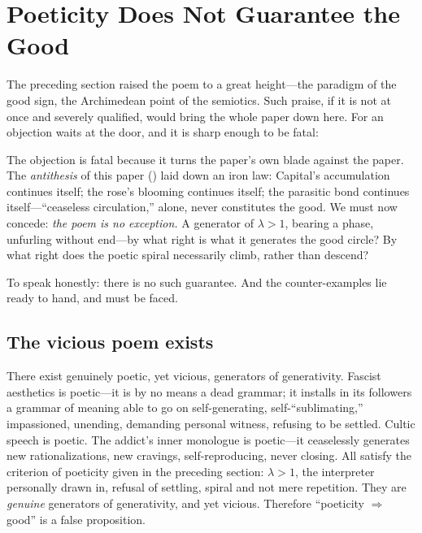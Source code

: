 \section{Poeticity Does Not Guarantee the Good}
\label{p09:sec:turn}

The preceding section raised the poem to a great height---the paradigm of the good sign, the Archimedean point of the semiotics. Such praise, if it is not at once and severely qualified, would bring the whole paper down here. For an objection waits at the door, and it is sharp enough to be fatal: 

The objection is fatal because it turns the paper's own blade against the paper. The \emph{antithesis} of this paper () laid down an iron law:  Capital's accumulation continues itself; the rose's blooming continues itself; the parasitic bond continues itself---``ceaseless circulation,'' alone, never constitutes the good. We must now concede: \emph{the poem is no exception.} A generator of $\lambda>1$, bearing a phase, unfurling without end---by what right is what it generates the good circle? By what right does the poetic spiral necessarily climb, rather than descend?

To speak honestly: there is no such guarantee. And the counter-examples lie ready to hand, and must be faced.

\subsection{The vicious poem exists}
\label{p09:sec:vicious-poem}

\begin{claim}
There exist genuinely poetic, yet vicious, generators of generativity. Fascist aesthetics is poetic---it is by no means a dead grammar; it installs in its followers a grammar of meaning able to go on self-generating, self-``sublimating,'' impassioned, unending, demanding personal witness, refusing to be settled. Cultic speech is poetic. The addict's inner monologue is poetic---it ceaselessly generates new rationalizations, new cravings, self-reproducing, never closing. All satisfy the criterion of poeticity given in the preceding section: $\lambda>1$, the interpreter personally drawn in, refusal of settling, spiral and not mere repetition. They are \emph{genuine} generators of generativity, and yet vicious. Therefore ``poeticity $\Rightarrow$ good'' is a false proposition.
\end{claim}

